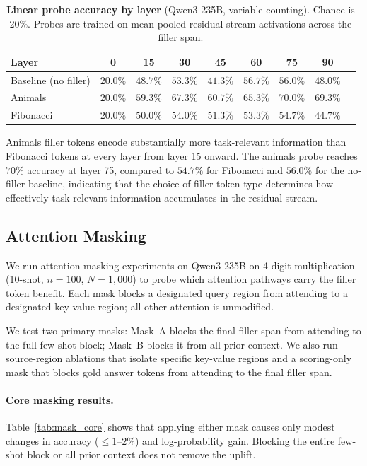 \documentclass{article}
\begin{document}
\begin{table}[h]
\centering
\caption{\textbf{Linear probe accuracy by layer} (Qwen3-235B, variable counting). Chance is $20\%$. Probes are trained on mean-pooled residual stream activations across the filler span.}
\label{tab:linear_probe}
\small
{}
\begin{tabular}{@{}lcccccccc@{}}
\toprule
\textbf{Layer} & 0 & 15 & 30 & 45 & 60 & 75 & 90 \\
\midrule
Baseline (no filler) & $20.0\%$ & $48.7\%$ & $53.3\%$ & $41.3\%$ & $56.7\%$ & $56.0\%$ & $48.0\%$ \\
Animals              & $20.0\%$ & $59.3\%$ & $67.3\%$ & $60.7\%$ & $65.3\%$ & $70.0\%$ & $69.3\%$ \\
Fibonacci            & $20.0\%$ & $50.0\%$ & $54.0\%$ & $51.3\%$ & $53.3\%$ & $54.7\%$ & $44.7\%$ \\
\bottomrule
\end{tabular}
\end{table}

Animals filler tokens encode substantially more task-relevant information than Fibonacci tokens at every layer from layer 15 onward. The animals probe reaches $70\%$ accuracy at layer 75, compared to $54.7\%$ for Fibonacci and $56.0\%$ for the no-filler baseline, indicating that the choice of filler token type determines how effectively task-relevant information accumulates in the residual stream.

\subsection{Attention Masking}
\label{app:attention_masking}

We run attention masking experiments on Qwen3-235B on 4-digit multiplication (10-shot, $n{=}100$, $N{=}1{,}000$) to probe which attention pathways carry the filler token benefit. Each mask blocks a designated query region from attending to a designated key-value region; all other attention is unmodified.

We test two primary masks: Mask~A blocks the final filler span from attending to the full few-shot block; Mask~B blocks it from all prior context. We also run source-region ablations that isolate specific key-value regions and a scoring-only mask that blocks gold answer tokens from attending to the final filler span.

\paragraph{Core masking results.} Table~\ref{tab:mask_core} shows that applying either mask causes only modest changes in accuracy ($\leq 1$--$2\%$) and log-probability gain. Blocking the entire few-shot block or all prior context does not remove the uplift.
\end{document}
